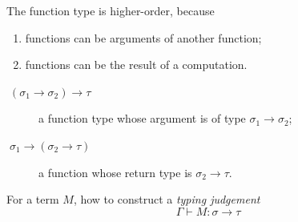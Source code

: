\begin{frame}
  The function type is \alert{higher-order}, because
  \begin{enumerate}
    \item functions can be arguments of another function;
    \item functions can be the result of a computation.
  \end{enumerate}
  \begin{example}
    \begin{description}
      \item[$\;(\sigma_1 \to \sigma_2) \to \tau$] a function type whose argument is of type $\sigma_1 \to \sigma_2$; 
      \item[$\;\sigma_1 \to (\sigma_2 \to \tau)$] a function whose return type is $\sigma_2 \to \tau$. 
    \end{description}
  \end{example}
    
For a term $M$, how to construct a \emph{typing judgement}
\[
  \Gamma \vdash M : \sigma \to \tau
\]
\end{frame}


